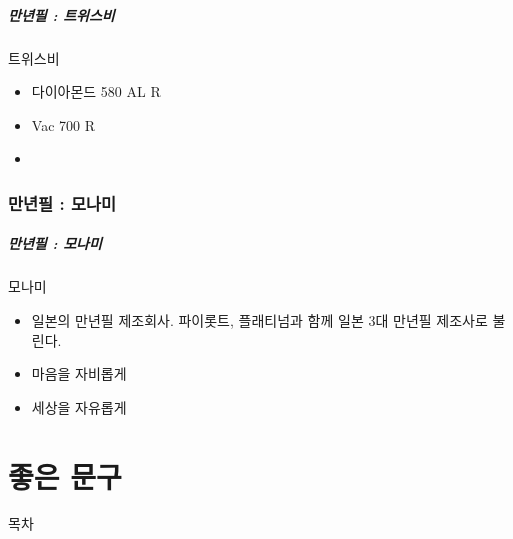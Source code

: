 \documentclass[aspectratio=1610,20pt,xcolor=pdftex,dvipsnames,table,handout]{beamer}
\begin{document}
		\begin{frame} [t,plain]
		\frametitle{만년필 : 트위스비 }

			\begin{block} {트위스비}
			\setlength{\leftmargini}{2em}			
			\begin{itemize}
				\item 다이아몬드 580 AL R 
				\item Vac 700 R
				\item 
			\end{itemize}
			\end{block}						

		\end{frame}						

		\section{만년필 : 모나미 }

		\begin{frame} [t,plain]
		\frametitle{만년필 : 모나미 }

			\begin{block} {모나미}
			\setlength{\leftmargini}{2em}			
			\begin{itemize}
				\item 일본의 만년필 제조회사. 파이롯트, 플래티넘과 함께 일본 3대 만년필 제조사로 불린다.
				\item 마음을 자비롭게
				\item 세상을 자유롭게
			\end{itemize}
			\end{block}						

		\end{frame}						




		\part{좋은 문구}
		\frame{\partpage}
		
\label{part4} 	%

		\begin{frame} [plain]{목차}
		\tableofcontents%
		\end{frame}
\end{document}
